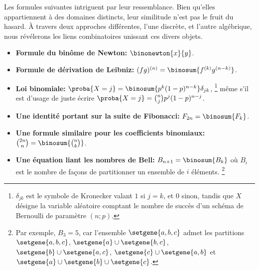 Les formules suivantes intriguent par leur ressemblance. Bien qu'elles appartiennent à des domaines distincts, leur similitude n’est pas le fruit du hasard. À travers deux approches différentes, l'une discrète, et l'autre algébrique, nous révélerons les liens combinatoires unissant ces divers objets.
%
\begin{itemize}
    \item \textbf{Formule du binôme de Newton:}
    $\binonewton{x}{y}$.


    \item \textbf{Formule de dérivation de Leibniz:}
    $(fg)^{(n)} = \binosum{f^{(k)} g^{(n-k)}}$.


    \item \textbf{Loi binomiale:}
    $\proba{X = j} = \binosum{p^k (1 - p)^{n-k}} \delta_{jk}$,%
    \footnote{
    	$\delta_{jk}$ est le symbole de Kronecker valant $1$ si $j=k$, et $0$ sinon,
		tandis que
		$X$ désigne la variable aléatoire comptant le nombre de succès d'un schéma de Bernoulli de paramètre $(n ; p)$.
    }
    même s'il est d'usage de juste écrire
    $\proba{X = j} =\binom{n}{j} p^j (1 - p)^{n-j}$.


    \item \textbf{Une identité portant sur la suite de Fibonacci:}
    $F_{2n} = \binosum{F_k}$.


    \item \textbf{Une formule similaire pour les coefficients binomiaux:}
    $\binom{2n}{n} = \binosum{\binom{n}{k}}$.


    \item \textbf{Une équation liant les nombres de Bell:}
    $B_{n+1} = \binosum{B_k}$ où $B_i$ est le nombre de façons de partitionner un ensemble de $i$ éléments.%
    \footnote{
    	Par exemple,
    	$B_3 = 5$,
    	car l'ensemble $\setgene{ a , b , c }$ admet les partitions
    	$\setgene{ a , b , c }$,
    	$\setgene{ a } \cup \setgene{ b , c }$,
    	$\setgene{ b } \cup \setgene{ a , c }$,
    	$\setgene{ c } \cup \setgene{ a , b }$
		et
    	$\setgene{ a } \cup \setgene{ b } \cup \setgene{ c }$.
	}
\end{itemize}